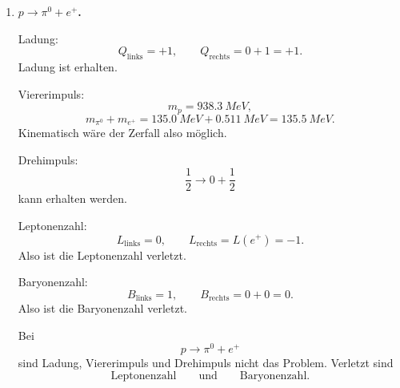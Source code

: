 \documentclass[11pt,a4paper]{scrartcl}
\theoremstyle{definition}
\theoremstyle{plain}
\theoremstyle{remark}
\begin{document}
\begin{enumerate}[label=(\alph*)]
\begin{calculationbox}
        Drehimpuls:
        \[
            \frac12\to\frac12+0
        \]
        kann erhalten werden.

        Leptonenzahl:
        \[
            L_{\mathrm{links}}=0,
            \qquad
            L_{\mathrm{rechts}}=0.
        \]
        Baryonenzahl:
        \[
            B_{\mathrm{links}}=+1,
            \qquad
            B_{\mathrm{rechts}}=B(\overline p)+B(\pi^+)=-1+0=-1.
        \]
        Also ist die Baryonenzahl verletzt.
    \end{calculationbox}

    \begin{answerbox}
        Bei
        \[
            \Lambda^0\to\overline p+\pi^+
        \]
        sind Ladung, Viererimpuls, Drehimpuls und Leptonenzahl erhalten. Verletzt ist
        \[
            \boxed{\text{Baryonenzahl: }+1\to -1.}
        \]
    \end{answerbox}

    \item \textbf{$p\to\pi^0+e^+$.}

    \begin{calculationbox}
        Ladung:
        \[
            Q_{\mathrm{links}}=+1,
            \qquad
            Q_{\mathrm{rechts}}=0+1=+1.
        \]
        Ladung ist erhalten.

        Viererimpuls:
        \[
            m_p=\SI{938.3}{MeV},
        \]
        \[
            m_{\pi^0}+m_{e^+}
            =
            \SI{135.0}{MeV}+\SI{0.511}{MeV}
            =
            \SI{135.5}{MeV}.
        \]
        Kinematisch wäre der Zerfall also möglich.

        Drehimpuls:
        \[
            \frac12\to0+\frac12
        \]
        kann erhalten werden.

        Leptonenzahl:
        \[
            L_{\mathrm{links}}=0,
            \qquad
            L_{\mathrm{rechts}}=L(e^+)=-1.
        \]
        Also ist die Leptonenzahl verletzt.

        Baryonenzahl:
        \[
            B_{\mathrm{links}}=1,
            \qquad
            B_{\mathrm{rechts}}=0+0=0.
        \]
        Also ist die Baryonenzahl verletzt.
    \end{calculationbox}

    \begin{answerbox}
        Bei
        \[
            p\to\pi^0+e^+
        \]
        sind Ladung, Viererimpuls und Drehimpuls nicht das Problem. Verletzt sind
        \[
            \boxed{\text{Leptonenzahl}}
            \qquad\text{und}\qquad
            \boxed{\text{Baryonenzahl}}.
        \]
    \end{answerbox}


\end{enumerate}
\end{document}
